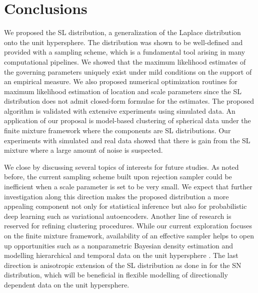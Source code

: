 \documentclass[10pt]{article}
\begin{document}
\section{Conclusions}\label{sec7:conclusion}

We proposed the SL distribution, a generalization of the Laplace distribution onto the unit hypersphere. The distribution was shown to be well-defined and provided with a sampling scheme, which is a fundamental tool arising in many computational pipelines. We showed that the maximum likelihood estimates of the governing parameters uniquely exist under mild conditions on the support of an empirical measure.  We also proposed  numerical optimization routines for maximum likelihood estimation of location and scale parameters since the SL distribution does not admit closed-form formulae for the estimates. The proposed algorithm is validated with extensive experiments using simulated data. An application of our proposal is model-based clustering of spherical data under the finite mixture framework where the components are SL distributions. Our experiments with simulated and real data showed that there is gain from the SL mixture  where a large amount of noise is suspected. 

We close by discussing several topics of interests for future studies. As noted before, the current sampling scheme built upon rejection sampler could be inefficient when a scale parameter is set to be very small. We expect that further investigation along this direction makes the proposed distribution a more appealing component not only for statistical inference but also for probabilistic deep learning such as variational autoencoders. Another line of research is reserved for refining clustering procedures. While our current exploration focuses on the finite mixture framework, availability of an effective sampler helps to open up opportunities such as a nonparametric Bayesian density estimation \cite{bhattacharya_2012_NonparametricBayesClassification} and modelling hierarchical and temporal data on the unit hypersphere  \cite{gopal_2014_MisesfisherClusteringModels}. The last direction is anisotropic extension of the SL distribution as done in \cite{hauberg_2018_DirectionalStatisticsSpherical} for the SN distribution, which will be beneficial in flexible modelling of directionally dependent data on the unit hypersphere. 




\end{document}

